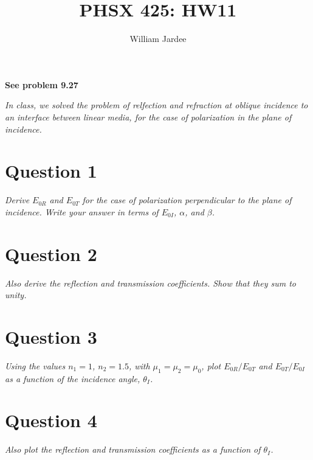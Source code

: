 \documentclass[12pt]{article}
\begin{document}
\title{PHSX 425: HW11}
\author{William Jardee}
\maketitle

\textbf{See problem 9.27}

\noindent
\emph{In class, we solved the problem of relfection and refraction at oblique incidence to an interface between linear media, for the case of polarization in the plane of incidence.}
\section*{Question 1}
\emph{Derive $E_{0R}$ and $E_{0T}$ for the case of polarization perpendicular to the plane of incidence. Write your answer in terms of $E_{0I}$, $\alpha$, and $\beta$.}

\section*{Question 2}
\emph{Also derive the reflection and transmission coefficients. Show that they sum to unity.}

\section*{Question 3}
\emph{Using the values $n_1 = 1$, $n_2 = 1.5$, with $\mu_1 = \mu_2 = \mu_0$, plot $E_{0R}/E_{0T}$ and $E_{0T}/E_{0I}$ as a function of the incidence angle, $\theta_I$.}

\section*{Question 4}
\emph{Also plot the reflection and transmission coefficients as a function of $\theta_I$.}
\end{document}
